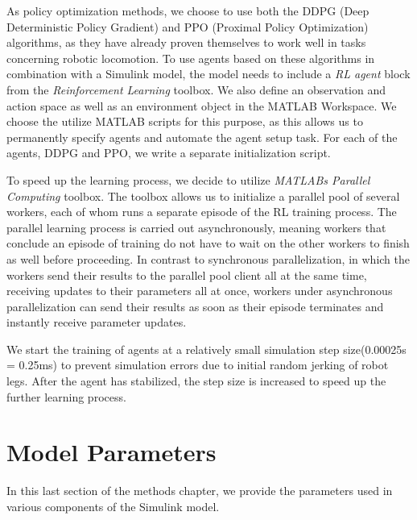 As policy optimization methods, we choose to use both the DDPG (Deep Deterministic Policy Gradient) and PPO (Proximal Policy Optimization) algorithms, as they have already proven themselves to work well in tasks concerning robotic locomotion\parencite{FIND AUTHOR}.
To use agents based on these algorithms in combination with a Simulink model, the model needs to include a \textit{RL agent} block from the \textit{Reinforcement Learning} toolbox.
We also define an observation and action space as well as an environment object in the MATLAB Workspace.
We choose the utilize MATLAB scripts for this purpose, as this allows us to permanently specify agents and automate the agent setup task.
For each of the agents, DDPG and PPO, we write a separate initialization script.

To speed up the learning process, we decide to utilize \textit{MATLABs Parallel Computing} toolbox.
The toolbox allows us to initialize a parallel pool of several workers, each of whom runs a separate episode of the RL training process.
The parallel learning process is carried out asynchronously, meaning workers that conclude an episode of training do not have to wait on the other workers to finish as well before proceeding.
In contrast to synchronous parallelization, in which the workers send their results to the parallel pool client all at the same time, receiving updates to their parameters all at once, workers under asynchronous parallelization can send their results as soon as their episode terminates and instantly receive parameter updates.

We start the training of agents at a relatively small simulation step size(0.00025s = 0.25ms) to prevent simulation errors due to initial random jerking of robot legs.
After the agent has stabilized, the step size is increased to speed up the further learning process.
\cite{lillicrap2015continuous}

\section{Model Parameters}
In this last section of the methods chapter, we provide the parameters used in various components of the Simulink model.

